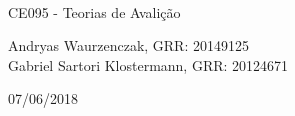 \begin{titlepage}
\\

\vspace{7.5cm}


\vspace{3cm}

CE095 - Teorias de Avalição

\vspace{2cm}

Andryas Waurzenczak, GRR: 20149125 \\
Gabriel Sartori Klostermann, GRR: 20124671


\vfill

07/06/2018
\end{titlepage}


\pagebreak
\tableofcontents
\pagebreak
